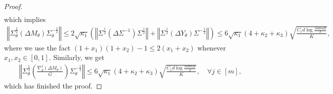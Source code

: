 \documentclass{article}
\numberwithin{equation}{section}
\begin{document}
\begin{proof}
\begin{align*}
\end{align*}
which implies
\begin{align*}
    \left\Vert\Sigma_\theta^{\frac{1}{2}}\left(\Delta M_\theta\right)\Sigma_\theta^{-\frac{1}{2}}\right\Vert\leq 2\sqrt{\kappa_1}\left(\left\Vert\Sigma^{\frac{1}{2}}\left(\Delta\Sigma^{-1}\right)\Sigma^{\frac{1}{2}}\right\Vert+\left\Vert\Sigma^{\frac{1}{2}}\left(\Delta Y_\theta\right)\Sigma^{-\frac{1}{2}}\right\Vert\right)\leq 6\sqrt{\kappa_1}(4+\kappa_2+\kappa_3)\sqrt{\frac{C_1d\log\frac{16dmH}{\delta}}{K}},
\end{align*}
where we use the fact $(1+x_1)(1+x_2)-1\leq 2(x_1+x_2)$ whenever $x_1,x_2\in[0,1]$. Similarly, we get
\begin{align*}
    \left\Vert\Sigma_\theta^{\frac{1}{2}}\left(\frac{\nabla_\theta^j\left(\Delta M_\theta\right)}{G}\right)\Sigma_\theta^{-\frac{1}{2}}\right\Vert\leq 6\sqrt{\kappa_1}(4+\kappa_2+\kappa_3)\sqrt{\frac{C_1d\log\frac{16dmH}{\delta}}{K}},\quad\forall j\in[m],
\end{align*}
which has finished the proof. 
\end{proof}
\end{document}
